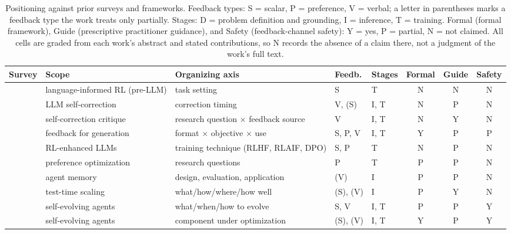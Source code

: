 \begin{table}[t]
    \centering
    \footnotesize
    \renewcommand{\arraystretch}{1.15}
    \caption{Positioning against prior surveys and frameworks. Feedback types: S = scalar, P = preference, V = verbal; a letter in parentheses marks a feedback type the work treats only partially. Stages: D = problem definition and grounding, I = inference, T = training. Formal (formal framework), Guide (prescriptive practitioner guidance), and Safety (feedback-channel safety): Y = yes, P = partial, N = not claimed. All cells are graded from each work's abstract and stated contributions, so N records the absence of a claim there, not a judgment of the work's full text.}
    \label{tab:surveys}
    \begin{tabular}{@{} p{} p{} p{} p{} p{} c c c @{}}
        \toprule
        \textbf{Survey} & \textbf{Scope} & \textbf{Organizing axis} & \textbf{Feedb.} & \textbf{Stages} & \textbf{Formal} & \textbf{Guide} & \textbf{Safety} \\
        \midrule
        \citet{luketina2019survey} & language-informed RL (pre-LLM) & task setting & S & T & N & N & N \\
        \citet{pan2023automatically} & LLM self-correction & correction timing & V, (S) & I, T & N & P & N \\
        \citet{kamoi2024can} & self-correction critique & research question $\times$ feedback source & V & I, T & N & Y & N \\
        \citet{fernandes2023bridging} & feedback for generation & format $\times$ objective $\times$ use & S, P, V & I, T & Y & P & P \\
        \citet{wang2024reinforcement} & RL-enhanced LLMs & training technique (RLHF, RLAIF, DPO) & S, P & T & N & P & N \\
        \citet{xiao2024comprehensive} & preference optimization & research questions & P & T & P & P & N \\
        \citet{zhang2025survey} & agent memory & design, evaluation, application & (V) & I & P & P & N \\
        \citet{zhang2025testtime} & test-time scaling & what/how/where/how well & (S), (V) & I & P & Y & N \\
        \citet{gao2025survey} & self-evolving agents & what/when/how to evolve & S, V & I, T & P & P & Y \\
        \citet{fang2025comprehensive} & self-evolving agents & component under optimization & (S), (V) & I, T & Y & P & Y \\

\end{tabular}
\end{table}
